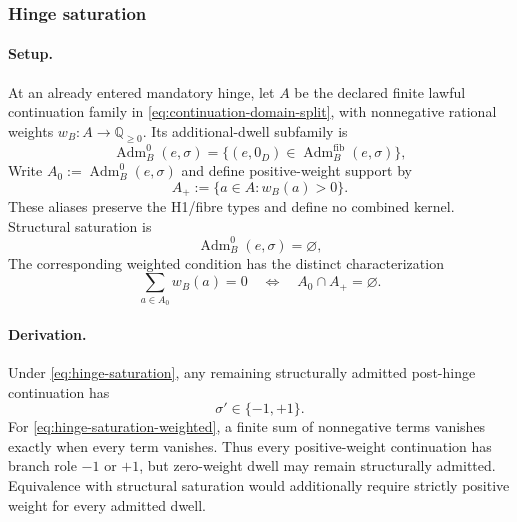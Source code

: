 \subsubsection{Hinge saturation}
\paragraph{Setup.}
At an already entered mandatory hinge, let \(A\) be the declared finite
lawful continuation family in \eqref{eq:continuation-domain-split}, with
nonnegative rational weights \(w_B:A\to\mathbb Q_{\ge0}\). Its
additional-dwell subfamily is
\begin{equation}
\operatorname{Adm}^{0}_{B}(e,\sigma)=
\{(e,0_D)\in\operatorname{Adm}^{\mathrm{fib}}_{B}(e,\sigma)\},
\label{eq:hinge-admissible-family}
\end{equation}
\label{subsec:fractal-jitter}
Write \(A_0:=\operatorname{Adm}^{0}_{B}(e,\sigma)\) and define positive-weight
support by
\begin{equation}
A_+:=\{a\in A:w_B(a)>0\}.
\label{eq:hinge-positive-support}
\end{equation}
These aliases preserve the H1/fibre types and define no combined kernel.
Structural saturation is
\begin{equation}
\operatorname{Adm}^{0}_{B}(e,\sigma)=\varnothing,
\label{eq:hinge-saturation}
\end{equation}
The corresponding weighted condition has the distinct characterization
\begin{equation}
\sum_{a\in A_0}w_B(a)=0
\quad\Longleftrightarrow\quad A_0\cap A_+=\varnothing.
\label{eq:hinge-saturation-weighted}
\end{equation}

\paragraph{Derivation.}
Under \eqref{eq:hinge-saturation}, any remaining structurally admitted
post-hinge continuation has
\begin{equation}
\sigma'\in\{-1,+1\}.
\label{eq:hinge-saturation-branch-continuation}
\end{equation}
For \eqref{eq:hinge-saturation-weighted}, a finite sum of nonnegative terms
vanishes exactly when every term vanishes. Thus every positive-weight
continuation has branch role \(-1\) or \(+1\), but zero-weight dwell may
remain structurally admitted.
Equivalence with structural saturation would additionally require strictly
positive weight for every admitted dwell.

